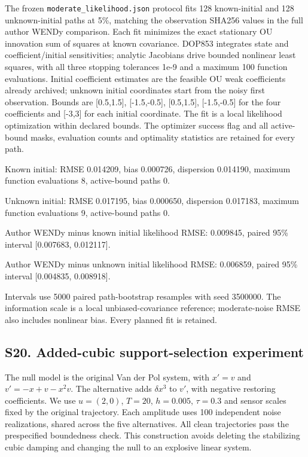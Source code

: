 \documentclass[
  american,
  11pt,
]{article}
\begin{document}
The frozen \texttt{moderate\_likelihood.json} protocol fits 128
known-initial and 128 unknown-initial paths at 5\%, matching the
observation SHA256 values in the full author WENDy comparison. Each fit
minimizes the exact stationary OU innovation sum of squares at known
covariance. DOP853 integrates state and coefficient/initial
sensitivities; analytic Jacobians drive bounded nonlinear least squares,
with all three stopping tolerances 1e-9 and a maximum 100 function
evaluations. Initial coefficient estimates are the feasible OU weak
coefficients already archived; unknown initial coordinates start from
the noisy first observation. Bounds are {[}0.5,1.5{]}, {[}-1.5,-0.5{]},
{[}0.5,1.5{]}, {[}-1.5,-0.5{]} for the four coefficients and {[}-3,3{]}
for each initial coordinate. The fit is a local likelihood optimization
within declared bounds. The optimizer success flag and all active-bound
masks, evaluation counts and optimality statistics are retained for
every path.

Known initial: RMSE 0.014209, bias 0.000726, dispersion 0.014190,
maximum function evaluations 8, active-bound paths 0.

Unknown initial: RMSE 0.017195, bias 0.000650, dispersion 0.017183,
maximum function evaluations 9, active-bound paths 0.

Author WENDy minus known initial likelihood RMSE: 0.009845, paired 95\%
interval {[}0.007683, 0.012117{]}.

Author WENDy minus unknown initial likelihood RMSE: 0.006859, paired
95\% interval {[}0.004835, 0.008918{]}.

Intervals use 5000 paired path-bootstrap resamples with seed 3500000.
The information scale is a local unbiased-covariance reference;
moderate-noise RMSE also includes nonlinear bias. Every planned fit is
retained.

\subsection{S20. Added-cubic support-selection
experiment}\label{s20.-added-cubic-support-selection-experiment}

The null model is the original Van der Pol system, with \(x'=v\) and
\(v'=-x+v-x^2v\). The alternative adds \(\delta x^3\) to \(v'\), with
negative restoring coefficients. We use \(u=(2,0)\), \(T=20\),
\(h=0.005\), \(\tau=0.3\) and sensor scales fixed by the original
trajectory. Each amplitude uses 100 independent noise realizations,
shared across the five alternatives. All clean trajectories pass the
prespecified boundedness check. This construction avoids deleting the
stabilizing cubic damping and changing the null to an explosive linear
system.
\end{document}
